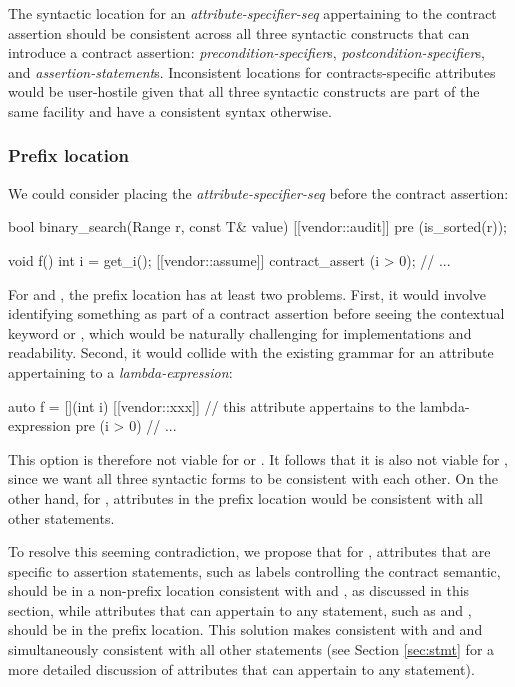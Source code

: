 The syntactic location for an \emph{attribute-specifier-seq} appertaining to the contract assertion should be consistent across all three syntactic constructs that can introduce a contract assertion: \emph{precondition-specifier}s, \emph{postcondition-specifier}s, and \emph{assertion-statement}s. Inconsistent locations for contracts-specific attributes would be user-hostile given that all three syntactic constructs are part of the same facility and have a consistent syntax otherwise.

\subsubsection{Prefix location}

We could consider placing the \emph{attribute-specifier-seq} before the contract assertion:
\begin{codeblock}
bool binary_search(Range r, const T& value)
  [[vendor::audit]] pre (is_sorted(r));  
  
void f() {
  int i = get_i();
  [[vendor::assume]] contract_assert (i > 0);
  // ...
}
\end{codeblock}

For  and , the prefix location has at least two problems. First, it would involve identifying something as part of a
contract assertion before seeing the contextual keyword  or , which would be naturally challenging for implementations and
readability. Second, it would collide with the existing grammar for an attribute appertaining to a \emph{lambda-expression}:

\begin{codeblock}
auto f = [](int i) [[vendor::xxx]]  // this attribute appertains to the lambda-expression
  pre (i > 0) {
  // ...
}
\end{codeblock}

This option is therefore not viable for  or . It follows that it is also not viable for , since we want all three syntactic forms to be consistent with each other. On the other hand, for , attributes in the prefix location would be consistent with all other statements.

To resolve this seeming contradiction, we propose that for , attributes that are specific to assertion statements, such as labels controlling the contract semantic, should be in a non-prefix location consistent with  and , as discussed in this section, while attributes that can appertain to any statement, such as \tcode{[[likely]]} and \tcode{[[unlikely]]}, should be in the prefix location. This solution makes  consistent with  and  and simultaneously consistent with all other statements (see Section \ref{sec:stmt} for a more detailed discussion of attributes that can appertain to any statement).

